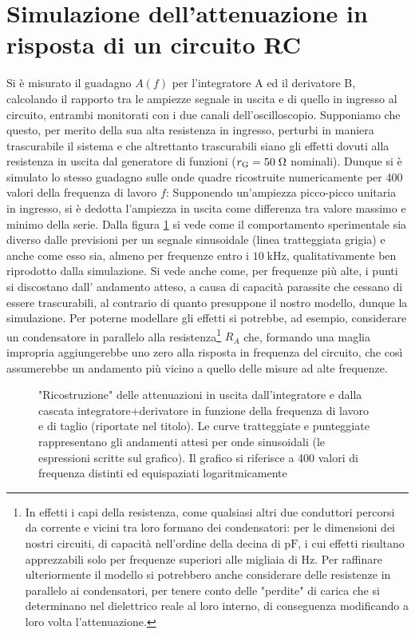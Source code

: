 \documentclass{article}[a4paper, oneside ,11pt]
\begin{document}
\section{Simulazione dell'attenuazione in risposta di un circuito RC}
Si è misurato il guadagno $A(f)$ per l’integratore A ed il derivatore B,
calcolando il rapporto tra le ampiezze segnale in uscita e di quello in
ingresso al circuito, entrambi monitorati con i due canali dell’oscilloscopio.
Supponiamo che questo, per merito della sua alta resistenza in ingresso,
perturbi in maniera trascurabile il sistema e che altrettanto trascurabili
siano gli effetti dovuti alla resistenza in uscita dal generatore di funzioni
($r_{\rm G} = 50 \; \Omega$ nominali). Dunque si è simulato lo stesso guadagno
sulle onde quadre ricostruite numericamente per 400 valori della frequenza di
lavoro $f$: Supponendo un'ampiezza picco-picco unitaria in ingresso, si è
dedotta l'ampiezza in uscita come differenza tra valore massimo e minimo della serie.
Dalla figura \ref{plt:gain} si vede come il comportamento sperimentale sia
diverso dalle previsioni per un segnale sinusoidale (linea tratteggiata grigia)
e anche come esso sia, almeno per frequenze entro i $10 \; \si{\kilo\hertz}$,
qualitativamente ben riprodotto dalla simulazione.
Si vede anche come, per frequenze più alte, i punti si discostano dall'
andamento atteso, a causa di capacità parassite che cessano di essere
trascurabili, al contrario di quanto presuppone il nostro modello,
dunque la simulazione. Per poterne modellare gli effetti si potrebbe,
ad esempio, considerare un condensatore in parallelo alla resistenza\footnote{
In effetti i capi della resistenza, come qualsiasi altri due
conduttori percorsi da corrente e vicini tra loro formano dei condensatori:
per le dimensioni dei nostri circuiti, di capacità nell'ordine della decina di
$\si{\pico\F}$, i cui effetti risultano apprezzabili solo per frequenze
superiori alle migliaia di Hz. Per raffinare ulteriormente il modello si
potrebbero anche considerare delle resistenze in parallelo ai condensatori, per
tenere conto delle "perdite" di carica che si determinano nel dielettrico
reale al loro interno, di conseguenza modificando a loro volta l'attenuazione.}
$R_A$ che, formando una maglia impropria aggiungerebbe uno zero alla risposta
in frequenza del circuito, che così assumerebbe un andamento più vicino a
quello delle misure ad alte frequenze.
\begin{figure}[!htb]
	\centering 
 		\scalebox{0.9}{}
 	\caption{"Ricostruzione" delle attenuazioni in uscita dall’integratore e dalla cascata integratore+derivatore in funzione della frequenza di lavoro e di taglio (riportate nel titolo). Le curve tratteggiate e punteggiate rappresentano gli andamenti attesi per onde sinusoidali (le espressioni scritte sul grafico). Il grafico si riferisce a 400 valori di frequenza distinti ed equispaziati logaritmicamente \label{plt:gain}}
\end{figure}
\end{document}
